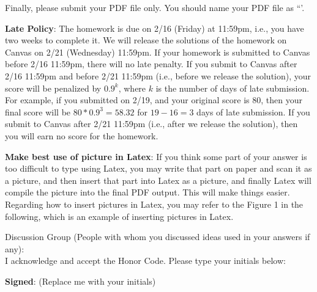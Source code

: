 \documentclass[12pt]{article}
\begin{document}
Finally, please submit your PDF file only. You should name your PDF file as ``{\color{blue}{Firstname-Lastname-NetID.pdf'}}'.

\vspace{.5cm}

\textbf{Late Policy}: The homework is due on 2/16 (Friday) at 11:59pm, i.e., you have two weeks to complete it. We will release the solutions of the homework on Canvas on 2/21 (Wednesday) 11:59pm. If your homework is submitted to Canvas before 2/16 11:59pm, there will no late penalty. If you submit to Canvas after 2/16 11:59pm and before 2/21 11:59pm (i.e., before we release the solution), your score will be penalized by $0.9^k$, where $k$ is the number of days of late submission. For example, if you submitted on 2/19, and your original score is 80, then your final score will be $80*0.9^3=58.32$ for $19-16=3$ days of late submission. If you submit to Canvas after 2/21 11:59pm (i.e., after we release the solution), then you will earn no score for the homework.

\vspace{.5cm}

\textbf{Make best use of picture in Latex}: If you think some part of your answer is too difficult to type using Latex, you may write that part on paper and scan it as a picture, and then insert that part into Latex as a picture, and finally Latex will compile the picture into the final PDF output. This will make things easier. Regarding how to insert pictures in Latex, you may refer to the Figure 1 in the following, which is an example of inserting pictures in Latex.


\hrulefill

Discussion Group (People with whom you discussed ideas used in your answers if any):     \\[1ex]


I acknowledge and accept the Honor Code. Please type your initials below:

\textbf{Signed}: ({\color{blue}Replace me with your initials})

\hrulefill


\end{document}

